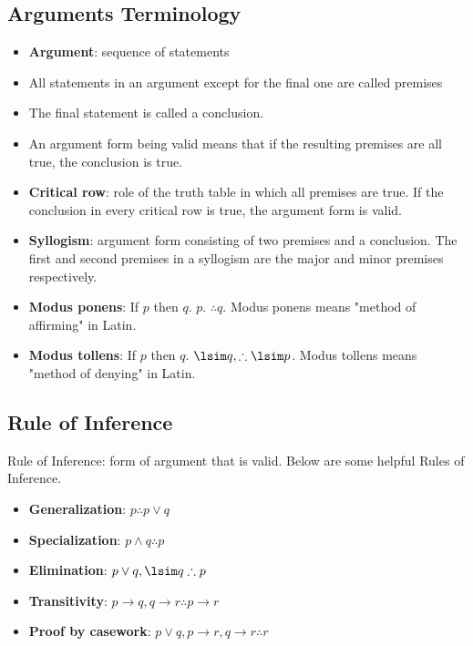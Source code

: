\documentclass[a4paper]{report}
\begin{document}
\subsection{Arguments Terminology}

\begin{itemize}
    \item \textbf{Argument}: sequence of statements
    \item All statements in an argument except for the final one are called premises
    \item The final statement is called a conclusion.
    \item An argument form being valid means that if the resulting premises are all true, the conclusion is true.
    \item \textbf{Critical row}: role of the truth table in which all premises are true. If the conclusion in every critical row is true, the argument form is valid.
    \item \textbf{Syllogism}: argument form consisting of two premises and a conclusion. The first and second premises in a syllogism are the major and minor premises respectively.
    \item \textbf{Modus ponens}: If $p$ then $q$. $p$. $\therefore q$. Modus ponens means "method of affirming" in Latin.
    \item \textbf{Modus tollens}: If $p$ then $q$. $\lsim q, \therefore \lsim p$. Modus tollens means "method of denying" in Latin.

\end{itemize}

\subsection{Rule of Inference}

Rule of Inference: form of argument that is valid. Below are some helpful Rules of Inference.
\begin{itemize}
    \item \textbf{Generalization}: $p \therefore p \lor q$
    \item \textbf{Specialization}: $p \land q \therefore p$
    \item \textbf{Elimination}: $p \lor q, \lsim q \therefore p$
    \item \textbf{Transitivity}: $p \to q, q \to r \therefore p \to r$
    \item \textbf{Proof by casework}: $p \lor q, p \to r, q \to r \therefore r$
\end{itemize}
\end{document}
